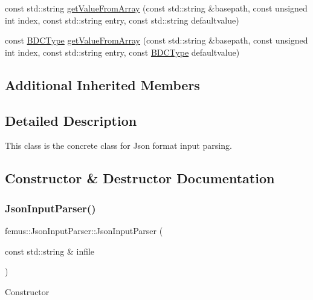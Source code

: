 \begin{DoxyCompactItemize}
\item 
const std\+::string \mbox{\hyperlink{classfemus_1_1_json_input_parser_a857a85ac2a5e12c433a143762b01d1e8}{get\+Value\+From\+Array}} (const std\+::string \&basepath, const unsigned int index, const std\+::string entry, const std\+::string defaultvalue)
\item 
const \mbox{\hyperlink{_b_d_c_type_enum_8hpp_ac1efcf28f6f152fe5354b888f616668d}{B\+D\+C\+Type}} \mbox{\hyperlink{classfemus_1_1_json_input_parser_a02383042c4eaebfd7e0743abcb91d771}{get\+Value\+From\+Array}} (const std\+::string \&basepath, const unsigned int index, const std\+::string entry, const \mbox{\hyperlink{_b_d_c_type_enum_8hpp_ac1efcf28f6f152fe5354b888f616668d}{B\+D\+C\+Type}} defaultvalue)
\end{DoxyCompactItemize}
\subsection*{Additional Inherited Members}


\subsection{Detailed Description}
This class is the concrete class for Json format input parsing. 

\subsection{Constructor \& Destructor Documentation}
\mbox{\label{classfemus_1_1_json_input_parser_a007eb525534f5f3c28c63d99f02c53ce}} 
\subsubsection{\texorpdfstring{Json\+Input\+Parser()}{JsonInputParser()}}
{\footnotesize\ttfamily femus\+::\+Json\+Input\+Parser\+::\+Json\+Input\+Parser (\begin{DoxyParamCaption}\item[{const std\+::string \&}]{infile }\end{DoxyParamCaption})}

Constructor \mbox{\label{classfemus_1_1_json_input_parser_afd478d2df10222adde53861eeb693177}} 
